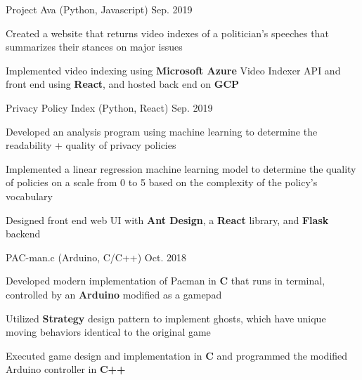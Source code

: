 

\begin{cventries}

  \cventry
    {Project Ava (Python, Javascript)} %
    {}
    {}
    {Sep. 2019} %
    {
      \begin{cvitems} %
        \item {Created a website that returns video indexes of a politician's speeches that summarizes their stances on major issues}
        \item {Implemented video indexing using \textbf{Microsoft Azure} Video Indexer API and front end using \textbf{React}, and hosted back end on \textbf{GCP}}
      \end{cvitems}
    }

  \cventry
    {Privacy Policy Index (Python, React)} %
    {}
    {}
    {Sep. 2019} %
    {
      \begin{cvitems} %
        \item {Developed an analysis program using machine learning to determine the readability + quality of privacy policies}
        \item {Implemented a linear regression machine learning model to determine the quality of policies on a scale from 0 to 5 based on the complexity of the policy's vocabulary}
        \item {Designed front end web UI with \textbf{Ant Design}, a \textbf{React} library, and \textbf{Flask} backend}
      \end{cvitems}
    }

  \cventry
  {PAC-man.c (Arduino, C/C++)} %
  {} %
  {}
  {Oct. 2018}
  {
    \begin{cvitems} %
      \item {Developed modern implementation of Pacman in \textbf{C} that runs in terminal, controlled by an \textbf{Arduino} modified as a gamepad}
      \item {Utilized \textbf{Strategy} design pattern to implement ghosts, which have unique moving behaviors identical to the original game}
      \item {Executed game design and implementation in \textbf{C} and programmed the modified Arduino controller in \textbf{C++}}
    \end{cvitems}
  }


\end{cventries}
